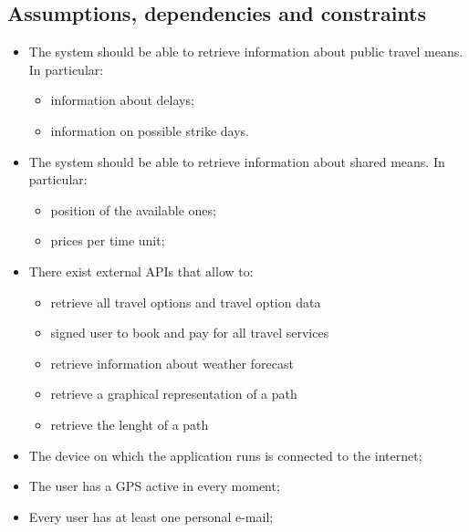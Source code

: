 \subsection{ Assumptions, dependencies and constraints}

\begin{itemize}

\item The system should be able to retrieve information about public travel means. In particular:
\begin{itemize}
\item information about delays;
\item information on possible strike days.
\end{itemize}

\item The system should be able to retrieve information about shared means. In particular:
\begin{itemize}
\item position of the available ones;
\item prices per time unit;
\end{itemize}

\item There exist external APIs that allow to:
\begin{itemize}
\item retrieve all travel options and travel option data
\item signed user to book and pay for all travel services
\item retrieve information about weather forecast
\item retrieve a graphical representation of a path
\item retrieve the lenght of a path
\end{itemize}

\item The device on which the application runs is connected to the internet;

\item The user has a GPS active in every moment;

\item Every user has at least one personal e-mail;

\end{itemize}




